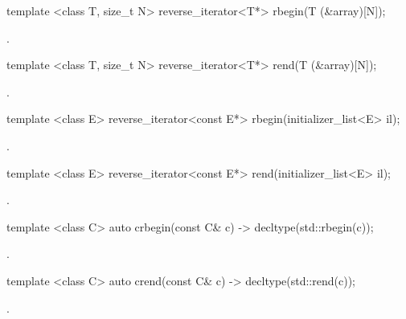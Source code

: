 %
\begin{itemdecl}
template <class T, size_t N> reverse_iterator<T*> rbegin(T (&array)[N]);
\end{itemdecl}
\begin{itemdescr}
\pnum \returns {}.
\end{itemdescr}

%
\begin{itemdecl}
template <class T, size_t N> reverse_iterator<T*> rend(T (&array)[N]);
\end{itemdecl}
\begin{itemdescr}
\pnum \returns {}.
\end{itemdescr}

%
\begin{itemdecl}
template <class E> reverse_iterator<const E*> rbegin(initializer_list<E> il);
\end{itemdecl}
\begin{itemdescr}
\pnum \returns {}.
\end{itemdescr}

%
\begin{itemdecl}
template <class E> reverse_iterator<const E*> rend(initializer_list<E> il);
\end{itemdecl}
\begin{itemdescr}
\pnum \returns {}.
\end{itemdescr}

%
\begin{itemdecl}
template <class C> auto crbegin(const C& c) -> decltype(std::rbegin(c));
\end{itemdecl}
\begin{itemdescr}
\pnum \returns {}.
\end{itemdescr}

%
\begin{itemdecl}
template <class C> auto crend(const C& c) -> decltype(std::rend(c));
\end{itemdecl}
\begin{itemdescr}
\pnum \returns {}.
\end{itemdescr}
